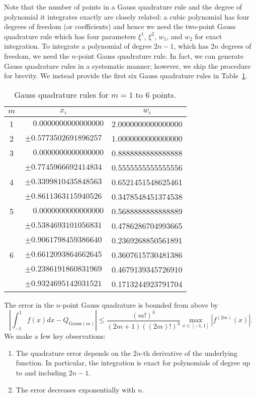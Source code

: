 Note that the number of points in a Gauss quadrature rule and the degree of polynomial it integrates exactly are closely related: a cubic polynomial has four degrees of freedom (or coefficients) and hence we need the two-point Gauss quadrature rule which has four parameters $\xi^1$, $\xi^2$, $w_1$, and $w_2$ for exact integration. To integrate a polynomial of degree $2n-1$, which has $2n$ degrees of freedom, we need the $n$-point Gauss quadrature rule.  In fact, we can generate Gauss quadrature rules in a systematic manner; however, we skip the procedure for brevity.  We instead provide the first six Gauss quadrature rules in Table~\ref{tb:imp_gauss}.
\begin{table}
  \centering
  \begin{tabular}{ccc}
    $m$ & $x_i$ & $w_i$ \\
    \hline
    1 & $\phantom{\pm}0.0000000000000000$ & 2.0000000000000000 \\
    \hline
    2 &  $\pm 0.5773502691896257$ & 1.0000000000000000 \\
    \hline
    3 & $\phantom{\pm}0.0000000000000000$ & 0.8888888888888888 \\
    & $\pm0.7745966692414834$ & 0.5555555555555556 \\
    \hline
    4 & $\pm 0.3399810435848563$ & 0.6521451548625461 \\
    & $\pm 0.8611363115940526$ & 0.3478548451374538 \\
    \hline
    5 & $\phantom{\pm}0.0000000000000000$ & 0.5688888888888889 \\
    & $\pm 0.5384693101056831$ & 0.4786286704993665 \\
    & $\pm 0.9061798459386640$ & 0.2369268850561891 \\
    \hline
    6 & $\pm 0.6612093864662645$ & 0.3607615730481386 \\
      & $\pm 0.2386191860831969$ & 0.4679139345726910 \\
      & $\pm 0.9324695142031521$ & 0.1713244923791704 
  \end{tabular}
  \caption{Gauss quadrature rules for $m = 1$ to $6$ points.}
  \label{tb:imp_gauss}
\end{table}

The error in the $n$-point Gauss quadrature is bounded from above by
\begin{equation*}
  | \int_{-1}^{1} f(x) dx - Q_{\text{Gauss}(m)} |
  \leq
  \frac{(m!)^4}{(2m+1)((2m)!)^3} \max_{x \in [-1,1]} |f^{(2m)}(x)|.
\end{equation*}
We make a few key observations:
\begin{enumerate}
\item The quadrature error depends on the $2n$-th derivative of the underlying function. In particular, the integration is exact for polynomials of degree up to and including $2n-1$.
\item The error decreases exponentially with $n$. 
\end{enumerate}

